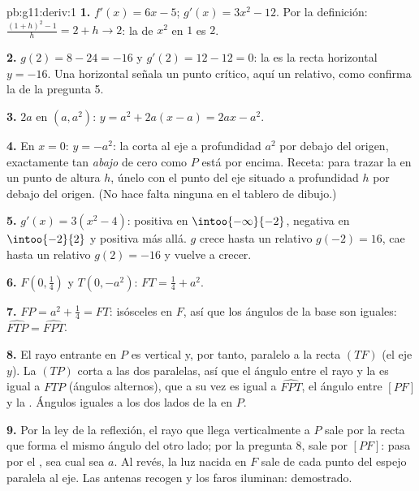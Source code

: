 \begin{solution}{pb:g11:deriv:1}
\textbf{1.} $f'(x) = 6x - 5$; $g'(x) = 3x^2 - 12$. Por la definición:
$\frac{(1 + h)^2 - 1}{h} = 2 + h \to 2$: la  de $x^2$ en $1$ es
$2$.

\textbf{2.} $g(2) = 8 - 24 = -16$ y $g'(2) = 12 - 12 = 0$: la  es
la recta horizontal $y = -16$. Una  horizontal señala un punto
crítico, aquí un  relativo, como confirma la  de
la pregunta 5.

\textbf{3.}  $2a$ en $(a, a^2)$:
$y = a^2 + 2a(x - a) = 2ax - a^2$.

\textbf{4.} En $x = 0$: $y = -a^2$: la  corta al eje a
profundidad $a^2$ por debajo del origen, exactamente tan \emph{abajo} de
cero como $P$ está por encima. Receta: para trazar la  en un punto
de altura $h$, únelo con el punto del eje situado a profundidad $h$ por
debajo del origen. (No hace falta ninguna  en el tablero de
dibujo.)

\textbf{5.} $g'(x) = 3(x^2 - 4)$: positiva en $\intoo{-\infty}{-2}$,
negativa en $\intoo{-2}{2}$ y positiva más allá. $g$ crece hasta un 
relativo $g(-2) = 16$, cae hasta un  relativo $g(2) = -16$ y vuelve
a crecer.

\textbf{6.} $F\left(0, \frac14\right)$ y $T(0, -a^2)$:
$FT = \frac14 + a^2$.

\textbf{7.} $FP = a^2 + \frac14 = FT$: isósceles en $F$, así que los
ángulos de la base son iguales: $\widehat{FTP} = \widehat{FPT}$.

\textbf{8.} El rayo entrante en $P$ es vertical y, por tanto, paralelo a
la recta $(TF)$ (el eje $y$). La  $(TP)$ corta a las dos
paralelas, así que el ángulo entre el rayo y la  es igual a
$\widehat{FTP}$ (ángulos alternos), que a su vez es igual a
$\widehat{FPT}$, el ángulo entre $[PF]$ y la . Ángulos iguales a
los dos lados de la  en $P$.

\textbf{9.} Por la ley de la reflexión, el rayo que llega verticalmente a
$P$ sale por la recta que forma el mismo ángulo del otro lado; por la
pregunta 8, sale por $[PF]$: pasa por el , sea cual sea $a$. Al
revés, la luz nacida en $F$ sale de cada punto del espejo paralela al eje.
Las antenas recogen y los faros iluminan: demostrado.


\end{solution}
